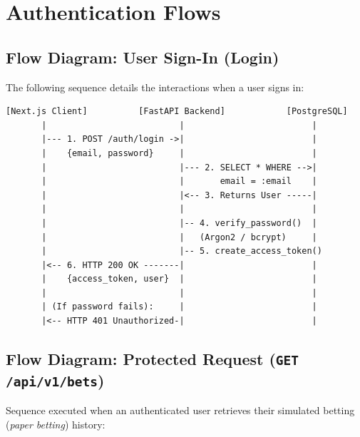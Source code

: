 \documentclass[11pt,a4paper]{article}
\begin{document}
\section{Authentication Flows}

\subsection{Flow Diagram: User Sign-In (Login)}

The following sequence details the interactions when a user signs in:

\begin{lstlisting}
[Next.js Client]          [FastAPI Backend]            [PostgreSQL]
       |                          |                         |
       |--- 1. POST /auth/login ->|                         |
       |    {email, password}     |                         |
       |                          |--- 2. SELECT * WHERE -->|
       |                          |       email = :email    |
       |                          |<-- 3. Returns User -----|
       |                          |                         |
       |                          |-- 4. verify_password()  |
       |                          |   (Argon2 / bcrypt)     |
       |                          |-- 5. create_access_token()
       |<-- 6. HTTP 200 OK -------|                         |
       |    {access_token, user}  |                         |
       |                          |                         |
       | (If password fails):     |                         |
       |<-- HTTP 401 Unauthorized-|                         |
\end{lstlisting}

\subsection{Flow Diagram: Protected Request (\texttt{GET /api/v1/bets})}

Sequence executed when an authenticated user retrieves their simulated betting (\textit{paper betting}) history:
\end{document}
